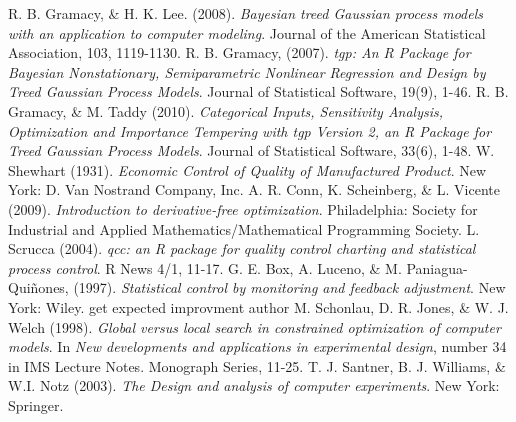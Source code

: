 \documentclass[12pt]{article}
\begin{document}
	
% 

\begin{thebibliography}{2}
 R. B. Gramacy, \& H. K. Lee. (2008). {\em Bayesian treed Gaussian process models with an application to computer modeling}. Journal of the American Statistical Association, 103, 1119-1130.
 R. B. Gramacy, (2007). {\em tgp: An R Package for Bayesian Nonstationary, Semiparametric Nonlinear Regression and Design by Treed Gaussian Process Models}. Journal of Statistical Software, 19(9), 1-46. %
 R. B. Gramacy, \& M. Taddy (2010). {\em Categorical Inputs, Sensitivity Analysis, Optimization and Importance Tempering with tgp Version 2, an R Package for Treed Gaussian Process Models}. Journal of Statistical Software, 33(6), 1-48. %
 W. Shewhart (1931). {\em Economic Control of Quality of Manufactured Product}. New York: D. Van Nostrand Company, Inc. 
 A. R. Conn, K. Scheinberg, \& L. Vicente (2009). {\em Introduction to derivative-free optimization}. Philadelphia: Society for Industrial and Applied Mathematics/Mathematical Programming Society.
 L. Scrucca (2004). {\em qcc: an R package for quality control charting and statistical process control}. R News 4/1, 11-17.
 G. E. Box, A. Luceno, \& M. Paniagua-Qui\~{n}ones, (1997). {\em Statistical control by monitoring and feedback adjustment}. New York: Wiley.
 get expected improvment author
 M. Schonlau, D. R. Jones, \& W. J. Welch (1998). {\em Global versus local search in constrained optimization of computer models}. In {\em New developments and applications in experimental design}, number 34 in IMS Lecture Notes. Monograph Series, 11-25.
 T. J. Santner, B. J. Williams, \& W.I. Notz (2003). {\em The Design and analysis of computer experiments}. New York: Springer. 
\end{thebibliography}
\end{document}
